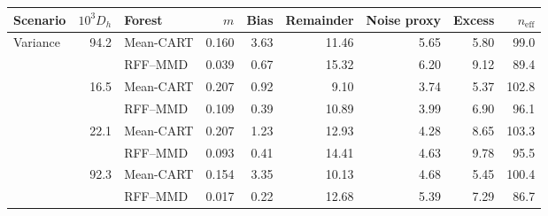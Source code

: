 \begin{tabular}{@{}lrlrrrrrr@{}}
\toprule
Scenario & $10^3D_h$ & Forest & $m$ & Bias & Remainder & Noise proxy & Excess & $n_{\mathrm{eff}}$ \\
\midrule
\multirow{2}{*}{Variance} & \multirow{2}{*}{94.2} & Mean-CART & 0.160 & 3.63 & 11.46 & 5.65 & 5.80 & 99.0 \\
 &  & RFF--MMD & 0.039 & 0.67 & 15.32 & 6.20 & 9.12 & 89.4 \\
\addlinespace
\multirow{2}{*}{Tail shape} & \multirow{2}{*}{16.5} & Mean-CART & 0.207 & 0.92 & 9.10 & 3.74 & 5.37 & 102.8 \\
 &  & RFF--MMD & 0.109 & 0.39 & 10.89 & 3.99 & 6.90 & 96.1 \\
\addlinespace
\multirow{2}{*}{Bimodality} & \multirow{2}{*}{22.1} & Mean-CART & 0.207 & 1.23 & 12.93 & 4.28 & 8.65 & 103.3 \\
 &  & RFF--MMD & 0.093 & 0.41 & 14.41 & 4.63 & 9.78 & 95.5 \\
\addlinespace
\multirow{2}{*}{Dependence} & \multirow{2}{*}{92.3} & Mean-CART & 0.154 & 3.35 & 10.13 & 4.68 & 5.45 & 100.4 \\
 &  & RFF--MMD & 0.017 & 0.22 & 12.68 & 5.39 & 7.29 & 86.7 \\
\bottomrule
\end{tabular}
